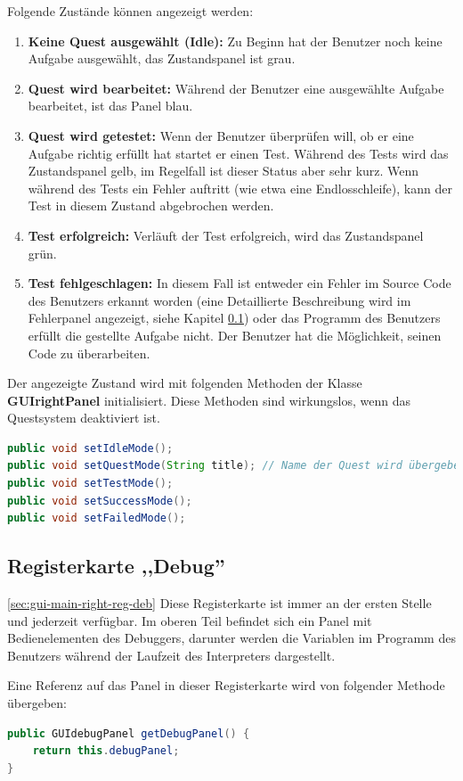 Folgende Zustände können angezeigt werden:
\begin{enumerate}
\item \textbf{Keine Quest ausgewählt (Idle):} Zu Beginn hat der Benutzer noch keine Aufgabe ausgewählt, das Zustandspanel ist grau.
\item \textbf{Quest wird bearbeitet:} Während der Benutzer eine ausgewählte Aufgabe bearbeitet, ist das Panel blau.
\item \textbf{Quest wird getestet:} Wenn der Benutzer überprüfen will, ob er eine Aufgabe richtig erfüllt hat startet er einen Test. Während des Tests wird das Zustandspanel gelb, im Regelfall ist dieser Status aber sehr kurz. Wenn während des Tests ein Fehler auftritt (wie etwa eine Endlosschleife), kann der Test in diesem Zustand abgebrochen werden.
\item \textbf{Test erfolgreich:} Verläuft der Test erfolgreich, wird das Zustandspanel grün.
\item \textbf{Test fehlgeschlagen:} In diesem Fall ist entweder ein Fehler im Source Code des Benutzers erkannt worden (eine Detaillierte Beschreibung wird im Fehlerpanel angezeigt, siehe Kapitel \ref{}) oder das Programm des Benutzers erfüllt die gestellte Aufgabe nicht. Der Benutzer hat die Möglichkeit, seinen Code zu überarbeiten.
\end{enumerate}

Der angezeigte Zustand wird mit folgenden Methoden der Klasse \textbf{GUIrightPanel} initialisiert. Diese Methoden sind wirkungslos, wenn das Questsystem deaktiviert ist.
\begin{lstlisting}[language=JAVA]
public void setIdleMode();
public void setQuestMode(String title); // Name der Quest wird übergeben
public void setTestMode();
public void setSuccessMode();
public void setFailedMode();
\end{lstlisting}

\subsection{Registerkarte ,,Debug''}
\ref{sec:gui-main-right-reg-deb}
Diese Registerkarte ist immer an der ersten Stelle und jederzeit verfügbar. Im oberen Teil befindet sich ein Panel mit Bedienelementen des Debuggers, darunter werden die Variablen im Programm des Benutzers während der Laufzeit des Interpreters dargestellt.

Eine Referenz auf das Panel in dieser Registerkarte wird von folgender Methode übergeben:
\begin{lstlisting}[language=JAVA]
public GUIdebugPanel getDebugPanel() {
	return this.debugPanel;
}
\end{lstlisting}

